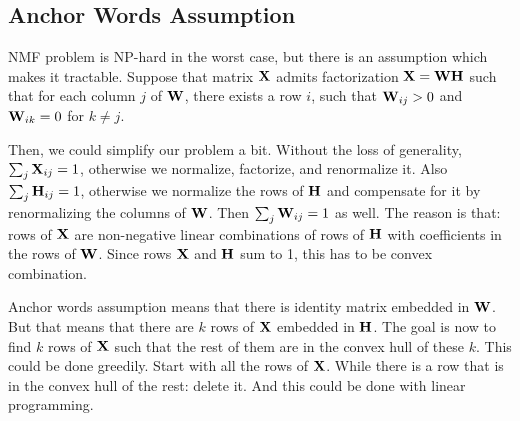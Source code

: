 \subsection{Anchor Words Assumption}

NMF problem is NP-hard in the worst case, but there is an assumption which makes it tractable. Suppose that matrix $\mathbf{X}$ admits factorization $\mathbf{X}=\mathbf{W}\mathbf{H}$ such that for each column $j$ of $\mathbf{W}$, there exists a row $i$, such that $\mathbf{W}_{ij}>0$ and $\mathbf{W}_{ik}=0$ for $k\neq j$.

Then, we could simplify our problem a bit. Without the loss of generality, $\sum_j\mathbf{X}_{ij}=1$, otherwise we normalize, factorize, and renormalize it. Also $\sum_j\mathbf{H}_{ij}=1$, otherwise we normalize the rows of $\mathbf{H}$ and compensate for it by renormalizing the columns of $\mathbf{W}$. Then $\sum_j\mathbf{W}_{ij}=1$ as well. The reason is that: rows of $\mathbf{X}$ are non-negative linear combinations of rows of $\mathbf{H}$ with coefficients in the rows of $\mathbf{W}$. Since rows $\mathbf{X}$ and $\mathbf{H}$ sum to 1, this has to be convex combination.

Anchor words assumption means that there is identity matrix embedded in $\mathbf{W}$. But that means that there are $k$ rows of $\mathbf{X}$ embedded in $\mathbf{H}$. The goal is now to find $k$ rows of $\mathbf{X}$ such that the rest of them are in the convex hull of these $k$. This could be done greedily. Start with all the rows of $\mathbf{X}$. While there is a row that is in the convex hull of the rest: delete it. And this could be done with linear programming.
